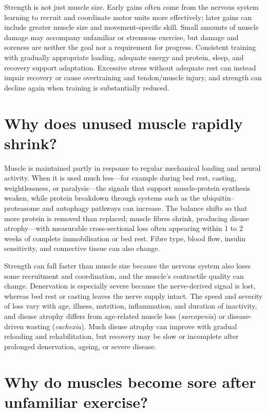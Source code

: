 \documentclass[11pt,oneside]{report}
\begin{document}
Strength is not just muscle size. Early gains often come from the nervous
system learning to recruit and coordinate motor units more effectively; later
gains can include greater muscle size and movement-specific skill. Small
amounts of muscle damage may accompany unfamiliar or strenuous exercise, but
damage and soreness are neither the goal nor a requirement for progress.
Consistent training with gradually appropriate loading, adequate energy and
protein, sleep, and recovery support adaptation. Excessive stress without adequate rest can instead
impair recovery or cause overtraining and tendon/muscle injury, and strength
can decline again when training is substantially reduced.

\section{Why does unused muscle rapidly shrink?}

Muscle is maintained partly in response to regular mechanical loading and
neural activity. When it is used much less—for example during bed rest,
casting, weightlessness, or paralysis—the signals that support muscle-protein
synthesis weaken, while protein breakdown through systems such as the
ubiquitin--proteasome and autophagy pathways can increase. The balance shifts
so that more protein is removed than replaced; muscle fibres shrink, producing
disuse atrophy—with measurable cross-sectional loss often appearing within 1 to
2 weeks of complete immobilisation or bed rest. Fibre type, blood flow, insulin sensitivity, and connective
tissue can also change.

Strength can fall faster than muscle size because the nervous system also loses
some recruitment and coordination, and the muscle's contractile quality can
change. Denervation is especially severe because the nerve-derived signal is
lost, whereas bed rest or casting leaves the nerve supply intact. The speed
and severity of loss vary with age, illness, nutrition, inflammation, and
duration of inactivity, and disuse atrophy differs from age-related muscle loss
(\emph{sarcopenia}) or disease-driven wasting (\emph{cachexia}). Much disuse atrophy can improve with gradual reloading
and rehabilitation, but recovery may be slow or incomplete after prolonged
denervation, ageing, or severe disease.

\section{Why do muscles become sore after unfamiliar exercise?}
\end{document}
